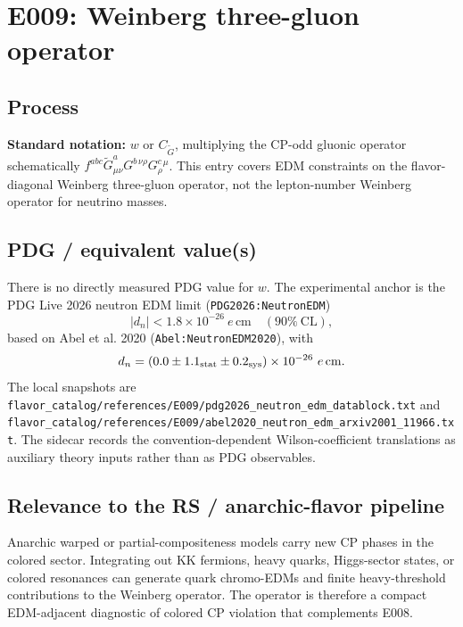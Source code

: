 
\section{E009: Weinberg three-gluon operator}

\subsection*{Process}
\textbf{Standard notation:} \(w\) or \(C_{\tilde G}\), multiplying the
CP-odd gluonic operator schematically
\(f^{abc}\tilde G^a_{\mu\nu}G^{b\,\nu\rho}G^c_{\rho}{}^{\mu}\).  This entry
covers EDM constraints on the flavor-diagonal Weinberg three-gluon operator,
not the lepton-number Weinberg operator for neutrino masses.

\subsection*{PDG / equivalent value(s)}
There is no directly measured PDG value for \(w\).  The experimental anchor is
the PDG Live 2026 neutron EDM limit (\texttt{PDG2026:NeutronEDM})
\[
  |d_n| < 1.8\times 10^{-26}\ e\,\mathrm{cm}\quad(90\%~\mathrm{CL}),
\]
based on Abel et al. 2020 (\texttt{Abel:NeutronEDM2020}), with
\[
  d_n=(0.0\pm1.1_{\rm stat}\pm0.2_{\rm sys})\times10^{-26}\ e\,\mathrm{cm}.
\]
The local snapshots are
\texttt{flavor\_catalog/references/E009/pdg2026\_neutron\_edm\_datablock.txt}
and
\texttt{flavor\_catalog/references/E009/abel2020\_neutron\_edm\_arxiv2001\_11966.txt}.
The sidecar records the convention-dependent Wilson-coefficient translations
as auxiliary theory inputs rather than as PDG observables.

\subsection*{Relevance to the RS / anarchic-flavor pipeline}
Anarchic warped or partial-compositeness models carry new CP phases in the
colored sector.  Integrating out KK fermions, heavy quarks, Higgs-sector states,
or colored resonances can generate quark chromo-EDMs and finite heavy-threshold
contributions to the Weinberg operator.  The operator is therefore a compact
EDM-adjacent diagnostic of colored CP violation that complements E008.

